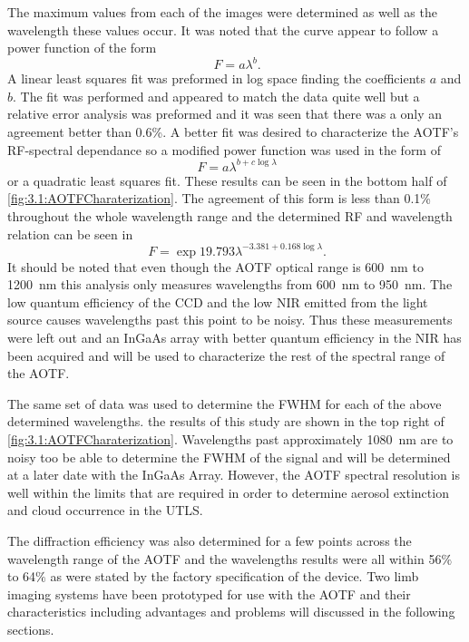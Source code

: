 The maximum values from each of the images were determined as well as the wavelength these values occur. It was noted that the curve appear to follow a power function of the form
\begin{equation}
    \ F = a\lambda^{b}.
    \label{eqn:3.1:powerFunction}
\end{equation}
A linear least squares fit was preformed in log space finding the coefficients $a$ and $b$. The fit was performed and appeared to match the data quite well but a relative error analysis was preformed and it was seen that there was a only an agreement better than 0.6\%. A better fit was desired to characterize the AOTF's RF-spectral dependance so a modified power function was used in the form of
 \begin{equation}
    \ F = a\lambda^{b+c\log\lambda}
    \label{eqn:3.1:modifiedPowerFunction}
\end{equation}
or a quadratic least squares fit. These results can be seen in the bottom half of \autoref{fig:3.1:AOTFCharaterization}. The agreement of this form is less than 0.1\% throughout the whole wavelength range and the determined RF and wavelength relation can be seen in
\begin{equation}
    \ F = \exp{19.793}\lambda^{-3.381+0.168\log\lambda}.
    \label{eqn:3.1:modifiedPowerFunctionCoeffiecicents}
\end{equation}
It should be noted that even though the AOTF optical range is 600~nm to 1200~nm this analysis only measures wavelengths from 600~nm to 950~nm. The low quantum efficiency of the CCD and the low NIR emitted from the light source causes wavelengths past this point to be noisy. Thus these measurements were left out and an InGaAs array with better quantum efficiency in the NIR has been acquired and will be used to characterize the rest of the spectral range of the AOTF.

The same set of data was used to determine the FWHM for each of the above determined wavelengths. the results of this study are shown in the top right of \autoref{fig:3.1:AOTFCharaterization}. Wavelengths past approximately 1080~nm are to noisy too be able to determine the FWHM of the signal and will be determined at a later date with the InGaAs Array. However, the AOTF spectral resolution is well within the limits that are required in order to determine aerosol extinction and cloud occurrence in the UTLS.

The diffraction efficiency was also determined for a few points across the wavelength range of the AOTF and the wavelengths results were all within 56$\%$ to 64$\%$ as were stated by the factory specification of the device. Two limb imaging systems have been prototyped for use with the AOTF and their characteristics including advantages and problems will discussed in the following sections. 